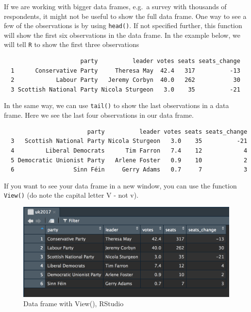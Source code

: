 \documentclass[12pt,oneside]{reedthesis}
\theoremstyle{definition}
\theoremstyle{definition}
\theoremstyle{definition}
\theoremstyle{remark}
\begin{document}
  If we are working with bigger data frames, e.g.~a survey with thousands
  of respondents, it might not be useful to show the full data frame. One
  way to see a few of the observations is by using \texttt{head()}. If not
  specified further, this function will show the first six observations in
  the data frame. In the example below, we will tell \texttt{R} to show
  the first three observations
  \begin{Shaded}
  \begin{Highlighting}[]
  \NormalTok{)  }
  \end{Highlighting}
  \end{Shaded}
  \begin{verbatim}
                      party          leader votes seats seats_change
  1      Conservative Party     Theresa May  42.4   317          -13
  2            Labour Party   Jeremy Corbyn  40.0   262           30
  3 Scottish National Party Nicola Sturgeon   3.0    35          -21
  \end{verbatim}
  In the same way, we can use \texttt{tail()} to show the last
  observations in a data frame. Here we see the last four observations in
  our data frame.
  \begin{Shaded}
  \begin{Highlighting}[]
  \NormalTok{)  }
  \end{Highlighting}
  \end{Shaded}
  \begin{verbatim}
                        party          leader votes seats seats_change
  3   Scottish National Party Nicola Sturgeon   3.0    35          -21
  4         Liberal Democrats      Tim Farron   7.4    12            4
  5 Democratic Unionist Party   Arlene Foster   0.9    10            2
  6                 Sinn Féin     Gerry Adams   0.7     7            3
  \end{verbatim}
  If you want to see your data frame in a new window, you can use the
  function \texttt{View()} (do note the capital letter V - not v).
  \begin{Shaded}
  \begin{Highlighting}[]
  \end{Highlighting}
  \end{Shaded}
  \begin{figure}
  \includegraphics[scale=0.65]{fig/View} \caption{Data frame with View(), RStudio}\label{fig:View}
  \end{figure}
\end{document}
